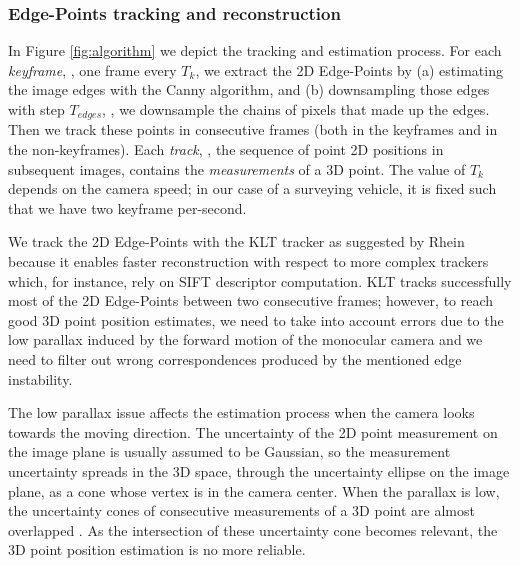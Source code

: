 

\subsubsection{Edge-Points tracking and reconstruction}
\label{subsubsec:Edge-Point-tracking}
In Figure \ref{fig:algorithm} we depict the tracking and estimation process.
For each \emph{keyframe}, \ie, one frame every $T_k$, we extract the 2D Edge-Points by (a) estimating the image edges with the Canny algorithm, and (b) downsampling those edges with step $T_{edges}$, \ie, we downsample the chains of pixels that made up the edges. 
Then we track these points in consecutive frames (both in  the keyframes and in the non-keyframes). Each \emph{track}, \ie, the sequence of point 2D positions in subsequent images, contains the \emph{measurements} of a 3D point. The value of $T_k$ depends on the camera speed; in our case of a surveying vehicle, it is fixed such that we have two keyframe per-second. 


We track the 2D Edge-Points with the KLT tracker \cite{Lucas_Kanade81} as suggested by Rhein \etal \cite{Rhein_et_al13} because it enables faster reconstruction with respect to more complex trackers which, for instance, rely on SIFT descriptor computation.
KLT tracks successfully most of the 2D Edge-Points between two consecutive frames; however, to reach good 3D point position estimates, we need to take into account errors due to the low parallax induced by the forward motion of the monocular camera and we need to filter out wrong correspondences produced by the mentioned edge instability. 


The low parallax issue affects the estimation process when the camera looks towards the moving direction. The uncertainty of the 2D point measurement on the image plane is usually assumed to be Gaussian, so the measurement uncertainty spreads in the 3D space, through the uncertainty ellipse on the image plane, as a cone whose vertex is in the camera center. 
When the parallax is low, the uncertainty cones of consecutive measurements of a 3D point are almost overlapped \cite{hazi04}. As the intersection of these uncertainty cone becomes relevant, the 3D point position estimation is no more reliable.

